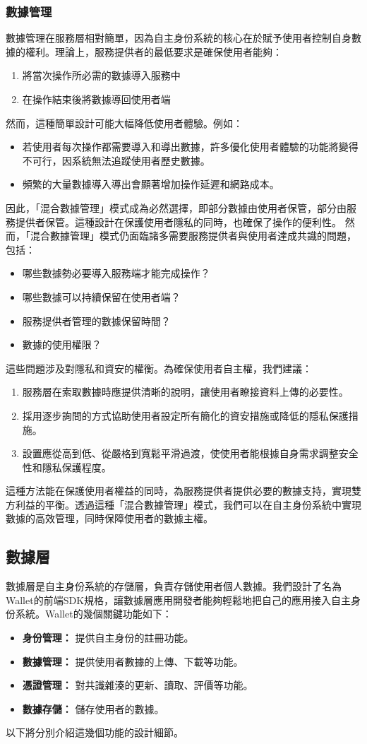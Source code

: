 \subsubsection{數據管理}
數據管理在服務層相對簡單，因為自主身份系統的核心在於賦予使用者控制自身數據的權利。理論上，服務提供者的最低要求是確保使用者能夠：
\begin{enumerate}
  \item 將當次操作所必需的數據導入服務中
  \item 在操作結束後將數據導回使用者端
\end{enumerate}
然而，這種簡單設計可能大幅降低使用者體驗。例如：
\begin{itemize}
  \item 若使用者每次操作都需要導入和導出數據，許多優化使用者體驗的功能將變得不可行，因系統無法追蹤使用者歷史數據。
  \item 頻繁的大量數據導入導出會顯著增加操作延遲和網路成本。
\end{itemize}
因此，「混合數據管理」模式成為必然選擇，即部分數據由使用者保管，部分由服務提供者保管。這種設計在保護使用者隱私的同時，也確保了操作的便利性。
然而，「混合數據管理」模式仍面臨諸多需要服務提供者與使用者達成共識的問題，包括：
\begin{itemize}
  \item 哪些數據勢必要導入服務端才能完成操作？
  \item 哪些數據可以持續保留在使用者端？
  \item 服務提供者管理的數據保留時間？
  \item 數據的使用權限？
\end{itemize}
這些問題涉及對隱私和資安的權衡。為確保使用者自主權，我們建議：
\begin{enumerate}
  \item 服務層在索取數據時應提供清晰的說明，讓使用者瞭接資料上傳的必要性。
  \item 採用逐步詢問的方式協助使用者設定所有簡化的資安措施或降低的隱私保護措施。
  \item 設置應從高到低、從嚴格到寬鬆平滑過渡，使使用者能根據自身需求調整安全性和隱私保護程度。
\end{enumerate}
這種方法能在保護使用者權益的同時，為服務提供者提供必要的數據支持，實現雙方利益的平衡。透過這種「混合數據管理」模式，我們可以在自主身份系統中實現數據的高效管理，同時保障使用者的數據主權。
\subsection{數據層}
數據層是自主身份系統的存儲層，負責存儲使用者個人數據。我們設計了名為Wallet的前端SDK規格，讓數據層應用開發者能夠輕鬆地把自己的應用接入自主身份系統。Wallet的幾個關鍵功能如下：
\begin{itemize}
  \item \textbf{身份管理：} 提供自主身份的註冊功能。
  \item \textbf{數據管理：} 提供使用者數據的上傳、下載等功能。
  \item \textbf{憑證管理：} 對共識雜湊的更新、讀取、評價等功能。
  \item \textbf{數據存儲：} 儲存使用者的數據。
\end{itemize}
以下將分別介紹這幾個功能的設計細節。
